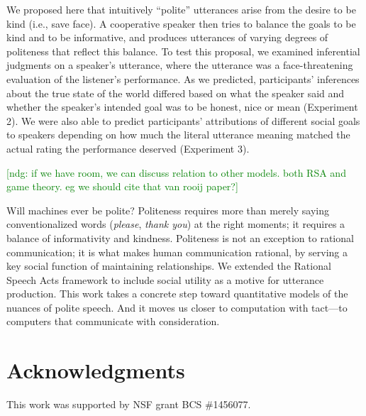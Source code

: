 \documentclass[10pt,letterpaper]{article}
\newcommand{\ndg}[1]{\textcolor{Green}{[ndg: #1]}}
\begin{document}
We proposed here that intuitively ``polite'' utterances arise from the desire to be kind (i.e., save face). 
A cooperative speaker then tries to balance the goals to be kind and to be informative, and produces utterances of varying degrees of politeness that reflect this balance.
To test this proposal, we examined inferential judgments on a speaker's utterance, where the utterance was a face-threatening evaluation of the listener's performance.
As we predicted, participants' inferences about the true state of the world differed based on what the speaker said and whether the speaker's intended goal was to be honest, nice or mean (Experiment 2).
We were also able to predict participants' attributions of different social goals to speakers depending on
how much the literal utterance meaning matched the actual rating the performance deserved (Experiment 3).



\ndg{if we have room, we can discuss relation to other models. both RSA and game theory. eg we should cite that van rooij paper?}

Will machines ever be polite?
Politeness requires more than merely saying conventionalized words (\emph{please}, \emph{thank you}) at the right moments; it requires a balance of informativity and kindness.
Politeness is not an exception to rational communication; it is what makes human communication rational, by serving a key social function of maintaining relationships.
We extended the Rational Speech Acts framework to include social utility as a motive for utterance production.
This work takes a concrete step toward quantitative models of the nuances of polite speech.
And it moves us closer to computation with tact---to computers that communicate with consideration.

\section{Acknowledgments}

This work was supported by NSF grant BCS \#1456077. 


\setlength{\bibleftmargin}{.125in}
\setlength{\bibindent}{-\bibleftmargin}


\end{document}
